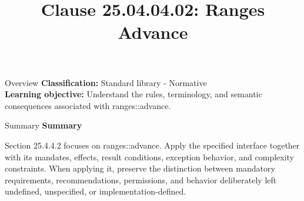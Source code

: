 \documentclass[10pt,letterpaper]{article}
\title{Clause 25.04.04.02: Ranges Advance}
\author{}
\date{}
\begin{document}
\maketitle
\begin{CornellOverviewBox}{Overview}
\textbf{Classification:} Standard library - Normative\\[2pt]
\textbf{Learning objective:} Understand the rules, terminology, and semantic consequences associated with ranges::advance.
\end{CornellOverviewBox}\begin{CornellSummaryBox}{Summary}
{\sffamily\bfseries\color{Accent} Summary}\par\vspace{3pt}Section 25.4.4.2 focuses on ranges::advance. Apply the specified interface together with its mandates, effects, result conditions, exception behavior, and complexity constraints. When applying it, preserve the distinction between mandatory requirements, recommendations, permissions, and behavior deliberately left undefined, unspecified, or implementation-defined.
\end{CornellSummaryBox}
\end{document}
